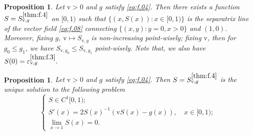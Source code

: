 \documentclass[12pt,a4paper]{amsart}
\numberwithin{equation}{section}
\theoremstyle{plain}
\newtheorem{proposition}[theorem]{Proposition}
\theoremstyle{remark}
\begin{document}
\begin{proposition} \label{thm:f.4}
	Let $\mathrm v>0$ and $g$ satisfy \eqref{eq:f.04}. 
	Then there exists a function $S= S^{\ref{thm:f.4}}_{\mathrm v, g}$ on $[0,1)$ such that $\{(x, S(x)): x\in [0,1)\}$ is the separatrix line of the vector field \eqref{eq:f.08} connecting $\{(x,y): y = 0, x>0\}$ and $(1,0)$.
	Moreover, fixing $g$, $\mathrm v \mapsto S_{\mathrm v, g}$ is non-increasing point-wisely; fixing $\mathrm v$, then for $g_0 \leq g_1$, we have  $S_{\mathrm v, g_0} \leq S_{\mathrm v, g_1}$ point-wisely.
	Note that, we also have 
	$
	S(0)  =\varepsilon_{\mathrm v, g}^{\ref{thm:f.3}}.
	$
\end{proposition}

\begin{proposition} \label{thm:f.4.5}
	Let $\mathrm v>0$ and $g$ satisfy \eqref{eq:f.04}. 
	Then $S= S^{\ref{thm:f.4}}_{\mathrm v, g}$ is the unique solution to the following problem 
	\begin{equation} \label{eq:09}
	\begin{cases}
	S \in C^1[0,1);
	\\S'(x) = 2 S(x)^{-1} \left(\mathrm v S(x) - g(x) \right), \quad x\in [0,1);
	\\\lim_{x\to 1} S(x) = 0.
	\end{cases}
	\end{equation}
\end{proposition}
\end{document}
